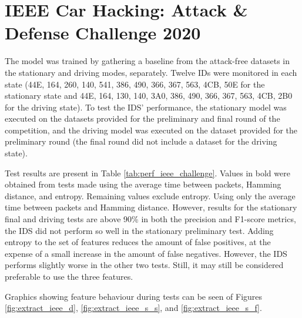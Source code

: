 \section{IEEE Car Hacking: Attack \& Defense Challenge 2020}

The model was trained by gathering a baseline from the attack-free datasets in the stationary and driving modes, separately. Twelve IDs were monitored in each state (44E, 164, 260, 140, 541, 386, 490, 366, 367, 563, 4CB, 50E for the stationary state and 44E, 164, 130, 140, 3A0, 386, 490, 366, 367, 563, 4CB, 2B0 for the driving state). To test the IDS' performance, the stationary model was executed on the datasets provided for the preliminary and final round of the competition, and the driving model was executed on the dataset provided for the preliminary round (the final round did not include a dataset for the driving state).\par
Test results are present in Table \ref{tab:perf_ieee_challenge}. Values in bold were obtained from tests made using the average time between packets, Hamming distance, and entropy. Remaining values exclude entropy. Using only the average time between packets and Hamming distance. However, results for the stationary final and driving tests are above 90\% in both the precision and F1-score metrics, the IDS did not perform so well in the stationary preliminary test. Adding entropy to the set of features reduces the amount of false positives, at the expense of a small increase in the amount of false negatives. However, the IDS performs slightly worse in the other two tests. Still, it may still be considered preferable to use the three features.\par
Graphics showing feature behaviour during tests can be seen of Figures \ref{fig:extract_ieee_d}, \ref{fig:extract_ieee_s_s}, and \ref{fig:extract_ieee_s_f}.

